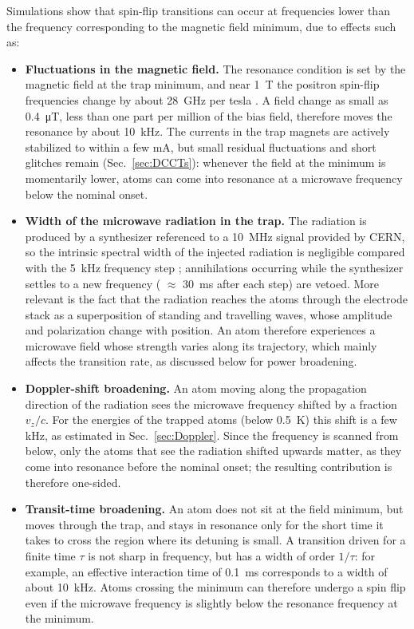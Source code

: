 Simulations show that spin-flip transitions can occur at frequencies lower than the frequency corresponding to the magnetic field minimum, due to effects such as: 
\begin{itemize}
    \item \textbf{Fluctuations in the magnetic field.} The resonance condition is set by the magnetic field at the trap minimum, and near \SI{1}{\tesla} the positron spin-flip frequencies change by about \SI{28}{\giga\hertz} per tesla \cite{ALPHA:2026lbu}. A field change as small as \SI{0.4}{\micro\tesla}, less than one part per million of the bias field, therefore moves the resonance by about \SI{10}{\kilo\hertz}. The currents in the trap magnets are actively stabilized to within a few mA, but small residual fluctuations and short glitches remain (Sec.~\ref{sec:DCCTs}): whenever the field at the minimum is momentarily lower, atoms can come into resonance at a microwave frequency below the nominal onset.
    \item \textbf{Width of the microwave radiation in the trap.} The radiation is produced by a synthesizer referenced to a \SI{10}{\mega\hertz} signal provided by CERN, so the intrinsic spectral width of the injected radiation is negligible compared with the \SI{5}{\kilo\hertz} frequency step \cite{ALPHA:2026lbu}; annihilations occurring while the synthesizer settles to a new frequency ( $\approx$ \SI{30}{\milli\second} after each step) are vetoed. More relevant is the fact that the radiation reaches the atoms through the electrode stack as a superposition of standing and travelling waves, whose amplitude and polarization change with position. An atom therefore experiences a microwave field whose strength varies along its trajectory, which mainly affects the transition rate, as discussed below for power broadening.
    \item \textbf{Doppler-shift broadening.} An atom moving along the propagation direction of the radiation sees the microwave frequency shifted by a fraction $v_z/c$. For the energies of the trapped atoms (below \SI{0.5}{\kelvin}) this shift is a few kHz, as estimated in Sec.~\ref{sec:Doppler}. Since the frequency is scanned from below, only the atoms that see the radiation shifted upwards matter, as they come into resonance before the nominal onset; the resulting contribution is therefore one-sided.
    \item \textbf{Transit-time broadening.} An atom does not sit at the field minimum, but moves through the trap, and stays in resonance only for the short time it takes to cross the region where its detuning is small. A transition driven for a finite time $\tau$ is not sharp in frequency, but has a width of order $1/\tau$: for example, an effective interaction time of \SI{0.1}{\milli\second} corresponds to a width of about \SI{10}{\kilo\hertz}. Atoms crossing the minimum can therefore undergo a spin flip even if the microwave frequency is slightly below the resonance frequency at the minimum.

\end{itemize}
